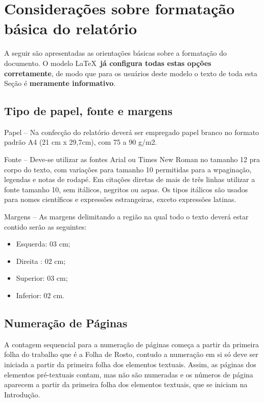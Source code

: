 \section{Considerações sobre formatação básica do relatório}

A seguir são apresentadas as orientações básicas sobre a formatação do
documento. O modelo \LaTeX\ \textbf{já configura todas estas opções corretamente},
de modo que para os usuários deste modelo o texto de toda esta Seção é
\textbf{meramente informativo}.

\subsection{Tipo de papel, fonte e margens}

Papel -- Na confecção do relatório deverá ser empregado papel branco no
formato padrão A4 (21 cm x 29,7cm), com 75 a 90 g/m2.

Fonte -- Deve-se utilizar as fontes Arial ou Times New Roman no tamanho 12
pra corpo do texto, com variações para tamanho 10 permitidas para a
wpaginação, legendas e notas de rodapé. Em citações diretas de mais de três
linhas utilizar a fonte tamanho 10, sem itálicos, negritos ou aspas. Os
tipos itálicos são usados para nomes científicos e expressões estrangeiras,
exceto expressões latinas.

Margens -- As margens delimitando a região na qual todo o texto deverá estar
contido serão as seguintes:

\begin{itemize}
	\item Esquerda: 03 cm;
	\item Direita	: 02 cm;
	\item Superior: 03 cm;
	\item Inferior: 02 cm.
\end{itemize}

\subsection{Numeração de Páginas}

A contagem sequencial para a numeração de páginas começa a partir da
primeira folha do trabalho que é a Folha de Rosto, contudo a numeração em
si só deve ser iniciada a partir da primeira folha dos elementos textuais.
Assim, as páginas dos elementos pré-textuais contam, mas não são numeradas
e os números de página aparecem a partir da primeira folha dos elementos
textuais, que se iniciam na Introdução.

